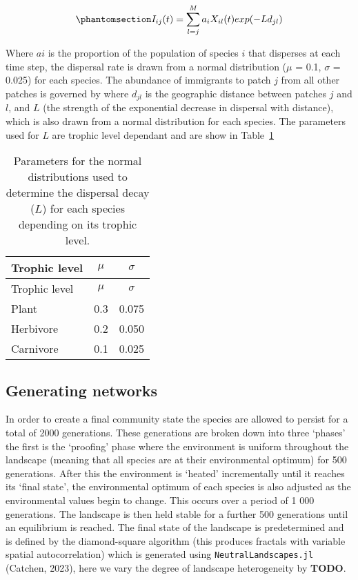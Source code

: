 \documentclass[
]{agujournal2019}
\begin{document}
\begin{equation}\phantomsection\label{eq-metacomm_imm}{
I_{ij}(t)=\sum_{l=j}^{M}a_iX_{il}(t)exp(-Ld_{jl})
}\end{equation}

Where \(ai\) is the proportion of the population of species \(i\) that
disperses at each time step, the dispersal rate is drawn from a normal
distribution (\(\mu\) = 0.1, \(\sigma\) = 0.025) for each species. The
abundance of immigrants to patch \(j\) from all other patches is
governed by where \(d_{jl}\) is the geographic distance between patches
\(j\) and \(l\), and \(L\) (the strength of the exponential decrease in
dispersal with distance), which is also drawn from a normal distribution
for each species. The parameters used for \(L\) are trophic level
dependant and are show in Table~\ref{tbl-interaction_decay}

\begin{longtable}[]{@{}lcc@{}}
\caption{Parameters for the normal distributions used to determine the
dispersal decay (\(L\)) for each species depending on its trophic
level.}\label{tbl-interaction_decay}\tabularnewline
\toprule\noalign{}
Trophic level & \(\mu\) & \(\sigma\) \\
\midrule\noalign{}
\endfirsthead
\toprule\noalign{}
Trophic level & \(\mu\) & \(\sigma\) \\
\midrule\noalign{}
\endhead
\bottomrule\noalign{}
\endlastfoot
Plant & 0.3 & 0.075 \\
Herbivore & 0.2 & 0.050 \\
Carnivore & 0.1 & 0.025 \\
\end{longtable}

\subsection{Generating networks}\label{generating-networks}

In order to create a final community state the species are allowed to
persist for a total of 2000 generations. These generations are broken
down into three `phases' the first is the `proofing' phase where the
environment is uniform throughout the landscape (meaning that all
species are at their environmental optimum) for 500 generations. After
this the environment is `heated' incrementally until it reaches its
`final state', the environmental optimum of each species is also
adjusted as the environmental values begin to change. This occurs over a
period of 1 000 generations. The landscape is then held stable for a
further 500 generations until an equilibrium is reached. The final state
of the landscape is predetermined and is defined by the diamond-square
algorithm (this produces fractals with variable spatial autocorrelation)
which is generated using \texttt{NeutralLandscapes.jl} (Catchen, 2023),
here we vary the degree of landscape heterogeneity by \textbf{TODO}.
\end{document}
